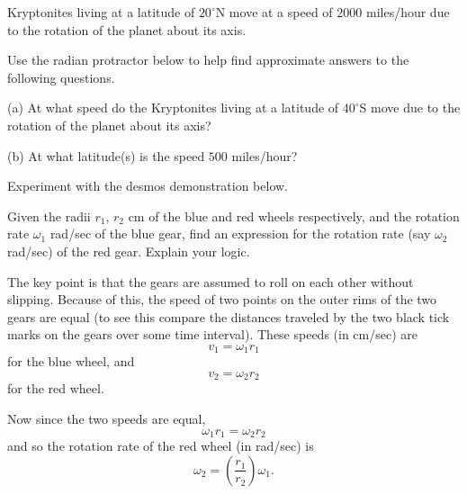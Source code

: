 \documentclass{ximera}
\begin{document}
\begin{question} \label{Q6721:Angles}
Kryptonites living at a latitude of $20^\circ$N move at a speed of $2000$ miles/hour due to the rotation of the planet about its axis.

Use the radian protractor below to help find approximate answers to the following questions.

(a) At what speed do the Kryptonites living at a latitude of $40^\circ$S move due to the rotation of the planet about its axis?

(b) At what latitude(s) is the speed $500$ miles/hour?

\begin{exploration}
 
\begin{onlineOnly}
    \begin{center}
\end{center}
\end{onlineOnly}
\end{exploration}

\end{question}



\begin{question}  \label{Q3242:Angles}
Experiment with the desmos demonstration below. 

Given the radii $r_1$, $r_2$ cm of the blue and red wheels respectively, and the rotation rate $\omega_1$ rad/sec of the blue gear, find an expression for the rotation rate (say $\omega_2$ rad/sec) of the red gear. Explain your logic.

 
\begin{onlineOnly}
    \begin{center}
\end{center}
\end{onlineOnly}


\begin{hint}
The key point is that the gears are assumed to roll on each other without slipping. Because of this, the speed of two points on the outer rims of the two gears are equal (to see this compare the distances traveled by the two black tick marks on the gears over some time interval). These speeds (in cm/sec) are 
\[
   v_1 = \omega_1 r_1
\]
for the blue wheel, and
\[
   v_2 = \omega_2 r_2
\]
for the red wheel.

Now since the two speeds are equal,
\[
   \omega_1 r_1 = \omega_2 r_2
\]
and so the rotation rate of the red wheel (in rad/sec) is
\[
  \omega_2 = \left( \frac{r_1}{r_2} \right) \omega_1 .
\]
\end{hint}

\end{question}
\end{document}
